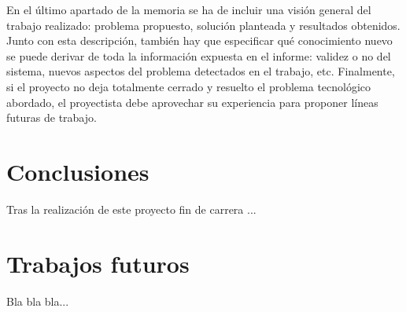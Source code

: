 \noindent En el último apartado de la memoria se ha de incluir una visión general del trabajo realizado: problema propuesto, solución planteada y resultados obtenidos. Junto con esta descripción, también hay que especificar qué conocimiento nuevo se puede derivar de toda la información expuesta en el informe: validez o no del sistema, nuevos aspectos del problema detectados en el trabajo, etc. Finalmente, si el proyecto no deja totalmente cerrado y resuelto el problema tecnológico abordado, el proyectista debe aprovechar su experiencia para proponer líneas futuras de trabajo.

\section{Conclusiones}

\noindent Tras la realización de este proyecto fin de carrera ... 

\section{Trabajos futuros}

\noindent Bla bla bla...